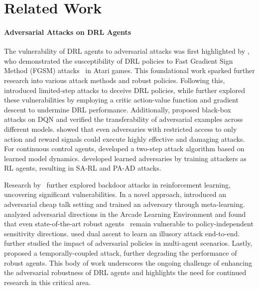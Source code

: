 \section{Related Work}
\paragraph{Adversarial Attacks on DRL Agents}
The vulnerability of DRL agents to adversarial attacks was first highlighted by \cite{huang2017adversarial}, who demonstrated the susceptibility of DRL policies to Fast Gradient Sign Method (FGSM) attacks~\citep{goodfellow2014explaining} in Atari games. This foundational work sparked further research into various attack methods and robust policies.
Following this, \cite{lin2017tactics, kos2017delving} introduced limited-step attacks to deceive DRL policies,
while \cite{pattanaik2017robust} further explored these vulnerabilities by employing a critic action-value function and gradient descent to undermine DRL performance.
Additionally, \cite{behzadan2017vulnerability} proposed black-box attacks on DQN and verified the transferability of adversarial examples across different models.
\cite{inkawhich2019snooping} showed that even adversaries with restricted access to only action and reward signals could execute highly effective and damaging attacks. 
For continuous control agents, \cite{weng2019toward} developed a two-step attack algorithm based on learned model dynamics.
\cite{zhang2021robust, sun2021strongest} developed learned adversaries by training attackers as RL agents, resulting in SA-RL and PA-AD attacks. 

Research by~\cite{kiourti2020trojdrl, wang2021backdoorl, bharti2022provable, guo2023policycleanse} further explored backdoor attacks in reinforcement learning, uncovering significant vulnerabilities.
In a novel approach, \cite{lu2023adversarial} introduced an adversarial cheap talk setting and trained an adversary through meta-learning. 
\cite{korkmaz2023adversarial} analyzed adversarial directions in the Arcade Learning Environment and found that even state-of-the-art robust agents~\citep{zhang2020robust, oikarinen2021robust} remain vulnerable to policy-independent sensitivity directions.
\cite{franzmeyerillusory} used dual ascent to learn an illusory attack end-to-end.
\cite{gleave2019adversarial} further studied the impact of adversarial policies in multi-agent scenarios.
Lastly, \cite{liang2023game} proposed a temporally-coupled attack, further degrading the performance of robust agents.
This body of work underscores the ongoing challenge of enhancing the adversarial robustness of DRL agents and highlights the need for continued research in this critical area.


